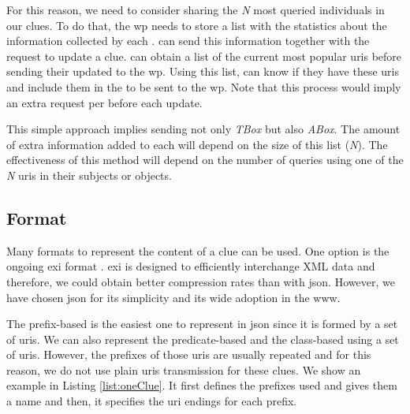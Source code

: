 For this reason, we need to consider sharing the \emph{N} most queried individuals in our clues.
To do that, the \ac{wp} needs to store a list with the statistics about the information collected by each \consumer{}.
\consumers{} can send this information together with the request to update a clue.
\providers{} can obtain a list of the current most popular \acp{uri} before sending their updated \clues{} to the \ac{wp}.
Using this list, \providers{} can know if they have these \acp{uri} and include them in the \clue{} to be sent to the \ac{wp}.
Note that this process would imply an extra request per \provider{} before each update.

This simple approach implies sending not only \emph{TBox} but also \emph{ABox}.
The amount of extra information added to each \clue{} will depend on the size of this list (\emph{N}).
The effectiveness of this method will depend on the number of queries using one of the \emph{N} \acp{uri} in their subjects or objects.


\subsection{Format}
Many formats to represent the content of a clue can be used.
One option is the ongoing \acf{exi} format . %
\ac{exi} is designed to efficiently interchange XML data and therefore, we could obtain better compression rates than with \ac{json}. %
However, we have chosen \ac{json} for its simplicity and its wide adoption in the \ac{www}.

The prefix-based \clue{} is the easiest one to represent in \ac{json} since it is formed by a set of \acp{uri}.
We can also represent the predicate-based and the class-based \clues{} using a set of \acp{uri}.
However, the prefixes of those \acp{uri} are usually repeated and for this reason, we do not use plain \acp{uri} transmission for these clues.
We show an example in Listing \ref{list:oneClue}.
It first defines the prefixes used and gives them a name and then, it specifies the \ac{uri} endings for each prefix.

